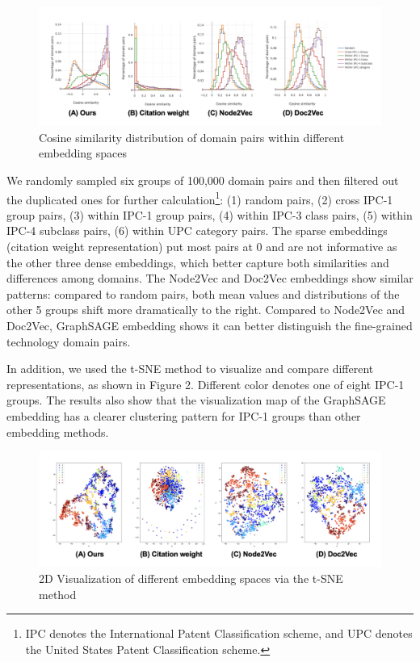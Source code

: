 \documentclass{article}
\begin{document}
\begin{figure}
	\centering
	\includegraphics[width=15cm]{FIG1.png}
	\caption{Cosine similarity distribution of domain pairs within different embedding spaces}
	\label{fig:fig1}
\end{figure}

We randomly sampled six groups of 100,000 domain pairs and then filtered out the duplicated ones for further calculation\footnote{IPC denotes the International Patent Classification scheme, and UPC denotes the United States Patent Classification scheme.}: (1) random pairs, (2) cross IPC-1 group pairs, (3) within IPC-1 group pairs, (4) within IPC-3 class pairs, (5) within IPC-4 subclass pairs, (6) within UPC category pairs. The sparse embeddings (citation weight representation) put most pairs at 0 and are not informative as the other three dense embeddings, which better capture both similarities and differences among domains. The Node2Vec and Doc2Vec embeddings show similar patterns: compared to random pairs, both mean values and distributions of the other 5 groups shift more dramatically to the right. Compared to Node2Vec and Doc2Vec, GraphSAGE embedding shows it can better distinguish the fine-grained technology domain pairs.

In addition, we used the t-SNE method to visualize and compare different representations, as shown in Figure 2. Different color denotes one of eight IPC-1 groups. The results also show that the visualization map of the GraphSAGE embedding has a clearer clustering pattern for IPC-1 groups than other embedding methods.

\begin{figure}[H]
	\centering
	\includegraphics[width=15cm]{FIG2.png}
	\caption{2D Visualization of different embedding spaces via the t-SNE method}
	\label{fig:fig2}
\end{figure}
\end{document}
